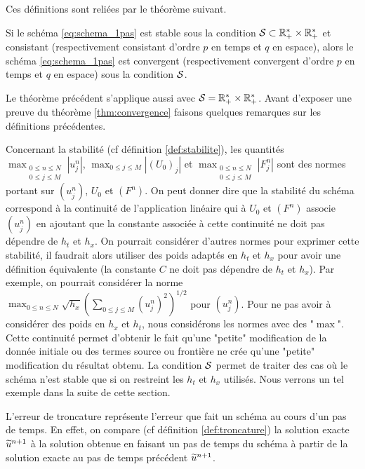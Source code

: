 \documentclass[12pt,a4paper,twoside]{article}
\begin{document}
Ces d\'efinitions sont reli\'ees par le th\'eor\`eme suivant.
\begin{theorem}
  \label{thm:convergence}
  Si le sch\'ema \eqref{eq:schema_1pas} est stable sous la condition
  $\mathcal{S} \subset \mathbb{R}_+^* \times \mathbb{R}_+^*$ et consistant 
  (respectivement consistant d'ordre $p$ en temps et $q$ en espace),
  alors le sch\'ema \eqref{eq:schema_1pas} est convergent
  (respectivement convergent d'ordre $p$ en temps et $q$ en espace)
  sous la condition $\mathcal{S}$.
\end{theorem}
Le th\'eor\`eme pr\'ec\'edent s'applique aussi avec $\mathcal{S} = \mathbb{R}_+^* \times \mathbb{R}_+^*$.
Avant d'exposer une preuve du th\'eor\`eme \ref{thm:convergence}
faisons quelques remarques sur les d\'efinitions pr\'ec\'edentes.

Concernant la stabilit\'e (cf d\'efinition \ref{def:stabilite}),
les quantit\'es $\max_{\substack{0\leq n \leq N\\ 0 \leq j \leq M}} | u_j^n |$, 
$\max_{0\leq j \leq M} | (U_0)_j |$ et $\max_{\substack{0\leq n \leq N\\ 0 \leq j \leq M}} | F_j^n |$ 
sont des normes portant sur $(u_j^n)$, $U_0$ et $(F^n)$.
On peut donner dire que la stabilit\'e du sch\'ema correspond \`a
la continuit\'e de l'application lin\'eaire qui \`a 
$U_0$ et $(F^n)$ associe $(u_j^n)$ en ajoutant que la constante
associ\'ee \`a cette continuit\'e ne doit pas d\'ependre
de $h_t$ et $h_x$.
On pourrait consid\'erer d'autres normes pour exprimer cette stabilit\'e,
il faudrait alors utiliser des poids adapt\'es en $h_t$ et $h_x$ pour 
avoir une d\'efinition \'equivalente (la constante $C$ ne doit
pas d\'ependre de $h_t$ et $h_x$).
Par exemple, on pourrait consid\'erer la norme
$\max_{0\leq n \leq N} \sqrt{h_x} (\sum_{0\leq j \leq M} (u_j^n)^2)^{1/2}$
pour $(u_j^n)$.
Pour ne pas avoir \`a consid\'erer des poids en $h_x$ et $h_t$,
nous consid\'erons les normes avec des "$\max$".
Cette continuit\'e permet d'obtenir le fait qu'une "petite"
modification de la donn\'ee initiale ou des termes source
ou fronti\`ere ne cr\'ee qu'une "petite" modification
du r\'esultat obtenu.
La condition $\mathcal{S}$ permet de traiter des cas o\`u le sch\'ema
n'est stable que si on restreint les $h_t$ et $h_x$ utilis\'es.
Nous verrons un tel exemple dans la suite de cette section.


L'erreur de troncature repr\'esente l'erreur que fait un sch\'ema
au cours d'un pas de temps.
En effet, on compare (cf d\'efinition \ref{def:troncature})
la solution exacte $\widetilde{u}^{n+1}$ \`a la solution 
obtenue en faisant un pas de temps du sch\'ema
\`a partir de la solution exacte au pas de temps
pr\'ec\'edent $\widetilde{u}^{n+1}$.
\end{document}
